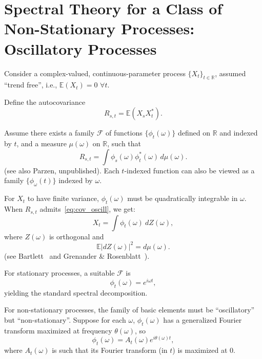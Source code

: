 \documentclass[12pt]{article}
\theoremstyle{definition}
\theoremstyle{plain}
\theoremstyle{remark}
\begin{document}
\section{Spectral Theory for a Class of Non-Stationary Processes: Oscillatory Processes}
\label{sec:oscillatory}

Consider a complex-valued, continuous-parameter process $\{X_t\}_{t \in \mathbb{R}}$, assumed ``trend free'', i.e., $\mathbb{E}(X_t) = 0$ $\forall t$.

Define the autocovariance
\begin{equation}
R_{s,t} = \mathbb{E}(X_s X_t^*).
\label{eq:autocov_general}
\end{equation}

Assume there exists a family $\mathcal{F}$ of functions $\{\phi_t(\omega)\}$ defined on $\mathbb{R}$ and indexed by $t$, and a measure $\mu(\omega)$ on $\mathbb{R}$, such that
\begin{equation}
R_{s,t} = \int \phi_s(\omega) \phi_t^*(\omega) \, d\mu(\omega).
\label{eq:cov_oscill}
\end{equation}
(see also Parzen, unpublished). Each $t$-indexed function can also be viewed as a family $\{\phi_\omega(t)\}$ indexed by $\omega$.

For $X_t$ to have finite variance, $\phi_t(\omega)$ must be quadratically integrable in $\omega$. When $R_{s,t}$ admits~\eqref{eq:cov_oscill}, we get:
\begin{equation}
X_t = \int \phi_t(\omega)\ dZ(\omega),
\label{eq:process_general}
\end{equation}
where $Z(\omega)$ is orthogonal and
\begin{equation}
\mathbb{E}|dZ(\omega)|^2 = d\mu(\omega).
\label{eq:orthog_measure}
\end{equation}
(see Bartlett~\cite{Bartlett1955} and Grenander \& Rosenblatt~\cite{GrenanderRosenblatt1957}).

For stationary processes, a suitable $\mathcal{F}$ is
\begin{equation}
\phi_t(\omega) = e^{i \omega t},
\label{eq:phi_stationary}
\end{equation}
yielding the standard spectral decomposition.

For non-stationary processes, the family of basic elements must be ``oscillatory'' but ``non-stationary''. Suppose for each $\omega$, $\phi_t(\omega)$ has a generalized Fourier transform maximized at frequency $\theta(\omega)$, so
\begin{equation}
\phi_t(\omega) = A_t(\omega) e^{i \theta(\omega) t},
\label{eq:phi_oscillatory}
\end{equation}
where $A_t(\omega)$ is such that its Fourier transform (in $t$) is maximized at 0.
\end{document}
